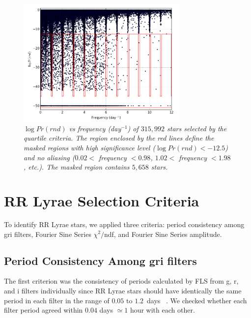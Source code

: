\documentclass[aps,prb,twocolumn,superscriptaddress]{revtex4-1}
\begin{document}
\begin{figure}[H]
 \centering
 	\includegraphics[width=3.3in]{figures/RlogPr.png}
 \caption{\it \small{$\log{Pr(rnd)}$ vs frequency (day$^{-1}$) of $315,992$ stars selected by the quartile criteria. The region enclosed by the red lines define the masked regions with high significance level ($\log{Pr(rnd)} < -12.5$) and no aliasing ($0.02<$ frequency $<0.98$, $1.02<$ frequency $<1.98$, etc.). The masked region contains $5,658$ stars.}} 
 \label{fig:logPr}
\end{figure}




\section{RR Lyrae Selection Criteria}\label{sec:RRcrit}

To identify RR Lyrae stars, we applied three criteria: period consistency among gri filters, Fourier Sine Series $\chi^2/$ndf, and Fourier Sine Series amplitude. 

\subsection{Period Consistency Among gri filters}
The first criterion was the consistency of periods calculated by FLS from g, r, and i filters individually since RR Lyrae stars should have identically the same period in each filter in the range of $0.05$ to $1.2$~days ~\citep{Astro}. We checked whether each filter period agreed within $0.04$ days $\simeq 1$ hour with each other. 
\end{document}
